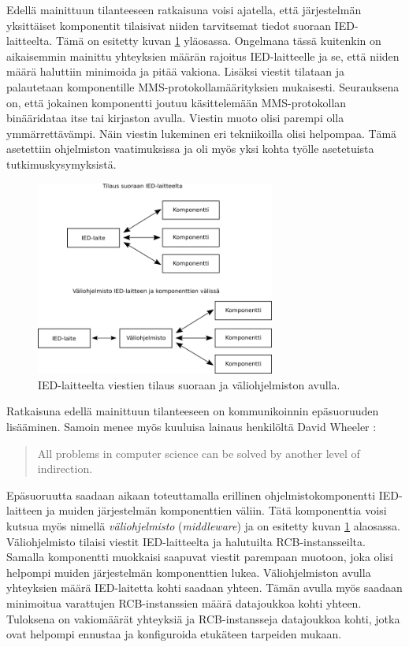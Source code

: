 Edellä mainittuun tilanteeseen ratkaisuna voisi ajatella, että järjestelmän yksittäiset komponentit tilaisivat niiden tarvitsemat tiedot suoraan IED-laitteelta. Tämä on esitetty kuvan \ref{fig:architecture-analysis} yläosassa. Ongelmana tässä kuitenkin on aikaisemmin mainittu yhteyksien määrän rajoitus IED-laitteelle ja se, että niiden määrä haluttiin minimoida ja pitää vakiona. Lisäksi viestit tilataan ja palautetaan komponentille MMS-protokollamäärityksien mukaisesti. Seurauksena on, että jokainen komponentti joutuu käsittelemään MMS-protokollan binääridataa itse tai kirjaston avulla. Viestin muoto olisi parempi olla ymmärrettävämpi. Näin viestin lukeminen eri tekniikoilla olisi helpompaa. Tämä asetettiin ohjelmiston vaatimuksissa ja oli myös yksi kohta työlle asetetuista tutkimuskysymyksistä.

\begin{figure}[ht!]
	\includegraphics[width=0.7\textwidth]{pictures/architecture-analysis.png}
	\caption{IED-laitteelta viestien tilaus suoraan ja väliohjelmiston avulla.}
	\label{fig:architecture-analysis}
\end{figure}

Ratkaisuna edellä mainittuun tilanteeseen on kommunikoinnin epäsuoruuden lisääminen. Samoin menee myös kuuluisa lainaus henkilöltä David Wheeler \cite[s.~290]{beautiful-code}:
\begin{quote}
	All problems in computer science can be solved by another level of indirection.
\end{quote}
Epäsuoruutta saadaan aikaan toteuttamalla erillinen ohjelmistokomponentti IED-laitteen ja muiden järjestelmän komponenttien väliin. Tätä komponenttia voisi kutsua myös nimellä \emph{väliohjelmisto} (\emph{middleware}) ja on esitetty kuvan \ref{fig:architecture-analysis} alaosassa. Väliohjelmisto tilaisi viestit IED-laitteelta ja halutuilta RCB-instansseilta. Samalla komponentti muokkaisi saapuvat viestit parempaan muotoon, joka olisi helpompi muiden järjestelmän komponenttien lukea. Väliohjelmiston avulla yhteyksien määrä IED-laitetta kohti saadaan yhteen. Tämän avulla myös saadaan minimoitua varattujen RCB-instanssien määrä datajoukkoa kohti yhteen. Tuloksena on vakiomäärät yhteyksiä ja RCB-instansseja datajoukkoa kohti, jotka ovat helpompi ennustaa ja konfiguroida etukäteen tarpeiden mukaan.

